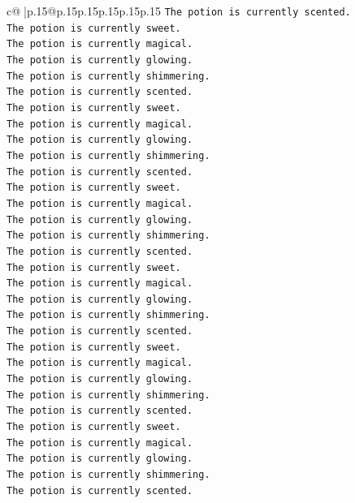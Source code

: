 \documentclass{article}
\begin{document}
{\begin{supertabular}{c@{$\;$}|p{.15\linewidth}@{}p{.15\linewidth}p{.15\linewidth}p{.15\linewidth}p{.15\linewidth}p{.15\linewidth}}
{{{\texttt{The potion is currently scented.} \\
\texttt{The potion is currently sweet.} \\
\texttt{The potion is currently magical.} \\
\texttt{The potion is currently glowing.} \\
\texttt{The potion is currently shimmering.} \\
\texttt{The potion is currently scented.} \\
\texttt{The potion is currently sweet.} \\
\texttt{The potion is currently magical.} \\
\texttt{The potion is currently glowing.} \\
\texttt{The potion is currently shimmering.} \\
\texttt{The potion is currently scented.} \\
\texttt{The potion is currently sweet.} \\
\texttt{The potion is currently magical.} \\
\texttt{The potion is currently glowing.} \\
\texttt{The potion is currently shimmering.} \\
\texttt{The potion is currently scented.} \\
\texttt{The potion is currently sweet.} \\
\texttt{The potion is currently magical.} \\
\texttt{The potion is currently glowing.} \\
\texttt{The potion is currently shimmering.} \\
\texttt{The potion is currently scented.} \\
\texttt{The potion is currently sweet.} \\
\texttt{The potion is currently magical.} \\
\texttt{The potion is currently glowing.} \\
\texttt{The potion is currently shimmering.} \\
\texttt{The potion is currently scented.} \\
\texttt{The potion is currently sweet.} \\
\texttt{The potion is currently magical.} \\
\texttt{The potion is currently glowing.} \\
\texttt{The potion is currently shimmering.} \\
\texttt{The potion is currently scented.} \\
}}}
\end{supertabular}}
\end{document}
